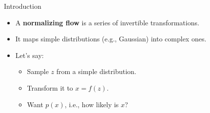 \begin{frame}{Introduction}
\begin{itemize}
    \item A \textbf{normalizing flow} is a series of invertible transformations.
    \item It maps simple distributions (e.g., Gaussian) into complex ones.
    \item Let's say:
    \begin{itemize}
        \item Sample $z$ from a simple distribution.
        \item Transform it to $x = f(z)$.
        \item Want $p(x)$, i.e., how likely is $x$?
    \end{itemize}
\end{itemize}
\end{frame}